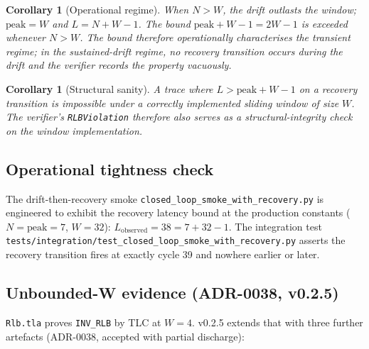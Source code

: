 \documentclass[11pt,a4paper]{article}
\newtheorem{corollary}[theorem]{Corollary}
\begin{document}
\begin{corollary}[Operational regime]\label{cor:regime}
When $N > W$, the drift outlasts the window; $\mathrm{peak} = W$
and $L = N + W - 1$. The bound $\mathrm{peak} + W - 1 = 2W - 1$ is
exceeded whenever $N > W$. The bound therefore operationally
characterises the \emph{transient} regime; in the sustained-drift
regime, no recovery transition occurs \emph{during the drift} and
the verifier records the property vacuously.
\end{corollary}

\begin{corollary}[Structural sanity]\label{cor:structural}
A trace where $L > \mathrm{peak} + W - 1$ on a recovery transition
is impossible under a correctly implemented sliding window of
size $W$. The verifier's \texttt{RLBViolation} therefore also
serves as a structural-integrity check on the window
implementation.
\end{corollary}

\subsection{Operational tightness check}
The drift-then-recovery smoke
\texttt{closed\_loop\_smoke\_with\_recovery.py} is engineered to
exhibit the recovery latency bound at the production constants
($N = \mathrm{peak} = 7$, $W = 32$):
$L_{\mathrm{observed}} = 38 = 7 + 32 - 1$. The integration test
\texttt{tests/integration/test\_closed\_loop\_smoke\_with\_recovery.py}
asserts the recovery transition fires at exactly cycle 39 and
nowhere earlier or later.

\subsection{Unbounded-W evidence (ADR-0038, v0.2.5)}
\label{sec:rlb-unbounded}

\texttt{Rlb.tla} proves \texttt{INV\_RLB} by TLC at $W = 4$.
v0.2.5 extends that with three further artefacts (ADR-0038,
accepted with partial discharge):
\end{document}
